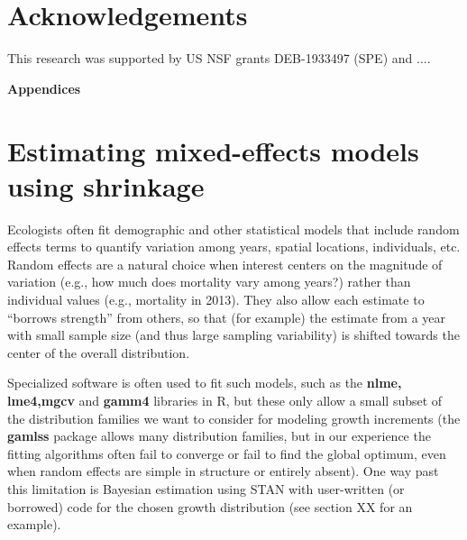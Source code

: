 \documentclass[11pt]{article}
\begin{document}
{\section*{Acknowledgements} 
This research was supported by US NSF grants DEB-1933497 (SPE) and .... 

%



\newpage 
\clearpage 
\setcounter{equation}{0}
\setcounter{figure}{0}
\setcounter{section}{0}
\setcounter{table}{0}
\setcounter{Box}{0}
\renewcommand{\theequation}{S.\arabic{equation}}
\renewcommand{\thetable}{S-\arabic{table}}
\renewcommand{\thefigure}{S-\arabic{figure}}
\renewcommand{\theBox}{S-\arabic{Box}}
\renewcommand{\thesection}{S.\arabic{section}}

\centerline{\Large{\textbf{Appendices}}}

\section{Estimating mixed-effects models using shrinkage}

Ecologists often fit demographic and other statistical models that include random effects terms to
quantify variation among years, spatial locations, individuals, etc. Random effects
are a natural choice when interest centers on the magnitude of variation (e.g., how much does mortality vary among years?)  
rather than individual values (e.g., mortality in 2013). They also allow each estimate to 
``borrows strength'' from others, so that (for example) the estimate from a year with small sample size (and thus large 
sampling variability) is shifted towards the center of the overall distribution. 

Specialized software is often used to fit such models, such as the \textbf{nlme, lme4,mgcv} and \textbf{gamm4} libraries in R,  
but these only allow a small subset of the distribution families we want to consider for modeling growth increments (the \textbf{gamlss} 
package allows many distribution families, but in our experience the fitting algorithms often fail to converge or fail to find the global optimum,
even when random effects are simple in structure or entirely absent). One way past this limitation is Bayesian estimation using STAN with
user-written (or borrowed) code for the chosen growth distribution (see section XX for an example). 

}
\end{document}
